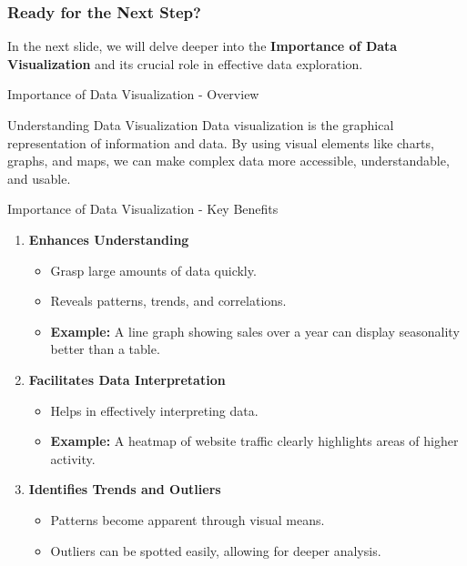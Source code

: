 \documentclass[aspectratio=169]{beamer}
\begin{document}
\begin{frame}[fragile]
    \frametitle{Ready for the Next Step?}
    In the next slide, we will delve deeper into the \textbf{Importance of Data Visualization} and its crucial role in effective data exploration.
\end{frame}

\begin{frame}[fragile]{Importance of Data Visualization - Overview}
    \begin{block}{Understanding Data Visualization}
        Data visualization is the graphical representation of information and data. By using visual elements like charts, graphs, and maps, we can make complex data more accessible, understandable, and usable.
    \end{block}
\end{frame}

\begin{frame}[fragile]{Importance of Data Visualization - Key Benefits}
    \begin{enumerate}
        \item \textbf{Enhances Understanding}  
            \begin{itemize}
                \item Grasp large amounts of data quickly.
                \item Reveals patterns, trends, and correlations.
                \item \textbf{Example:} A line graph showing sales over a year can display seasonality better than a table.
            \end{itemize}
        
        \item \textbf{Facilitates Data Interpretation}  
            \begin{itemize}
                \item Helps in effectively interpreting data.
                \item \textbf{Example:} A heatmap of website traffic clearly highlights areas of higher activity.
            \end{itemize}

        \item \textbf{Identifies Trends and Outliers}  
            \begin{itemize}
                \item Patterns become apparent through visual means.
                \item Outliers can be spotted easily, allowing for deeper analysis.
            \end{itemize}
    \end{enumerate}
\end{frame}
\end{document}
